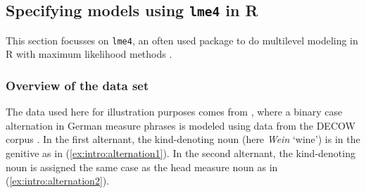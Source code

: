 \subsection{Specifying models using \texttt{lme4} in R}
\label{sec:specifyingmodelsusinglme4inr}

This section focusses on \texttt{lme4}, an often used package to do multilevel modeling in R with maximum likelihood methods \citep{BatesEa2015}.

\subsubsection{Overview of the data set}

The data used here for illustration purposes comes from \citet{Schaefer2018}, where a binary case alternation in German measure phrases is modeled using data from the DECOW corpus \citep{SchaeferBildhauer2012}.
In the first alternant, the kind-denoting noun (here \textit{Wein} `wine') is in the genitive as in (\ref{ex:intro:alternation1}).
In the second alternant, the kind-denoting noun is assigned the same case as the head measure noun as in (\ref{ex:intro:alternation2}).

\begin{exe}
  \ex\label{ex:intro:alternation}
  \begin{xlist}
  \end{xlist}
\end{exe}

